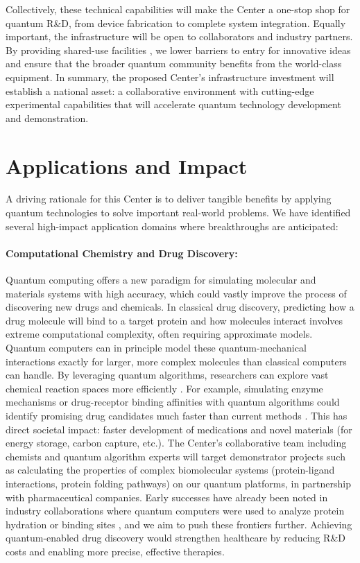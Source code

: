 \documentclass[12pt]{article}
\begin{document}
Collectively, these technical capabilities will make the Center a one-stop shop for quantum R&D, from device fabrication to complete system integration. Equally important, the infrastructure will be open to collaborators and industry partners. By providing shared-use facilities , we lower barriers to entry for innovative ideas and ensure that the broader quantum community benefits from the world-class equipment. In summary, the proposed Center’s infrastructure investment will establish a national asset: a collaborative environment with cutting-edge experimental capabilities that will accelerate quantum technology development and demonstration.



\section{Applications and Impact}



A driving rationale for this Center is to deliver tangible benefits by applying quantum technologies to solve important real-world problems. We have identified several high-impact application domains where breakthroughs are anticipated:



\paragraph{Computational Chemistry and Drug Discovery:} Quantum computing offers a new paradigm for simulating molecular and materials systems with high accuracy, which could vastly improve the process of discovering new drugs and chemicals. In classical drug discovery, predicting how a drug molecule will bind to a target protein and how molecules interact involves extreme computational complexity, often requiring approximate models. Quantum computers can in principle model these quantum-mechanical interactions exactly for larger, more complex molecules than classical computers can handle. By leveraging quantum algorithms, researchers can explore vast chemical reaction spaces more efficiently . For example, simulating enzyme mechanisms or drug-receptor binding affinities with quantum algorithms could identify promising drug candidates much faster than current methods . This has direct societal impact: faster development of medications and novel materials (for energy storage, carbon capture, etc.). The Center’s collaborative team including chemists and quantum algorithm experts will target demonstrator projects such as calculating the properties of complex biomolecular systems (protein-ligand interactions, protein folding pathways) on our quantum platforms, in partnership with pharmaceutical companies. Early successes have already been noted in industry collaborations where quantum computers were used to analyze protein hydration or binding sites , and we aim to push these frontiers further. Achieving quantum-enabled drug discovery would strengthen healthcare by reducing R&D costs and enabling more precise, effective therapies.
\end{document}
